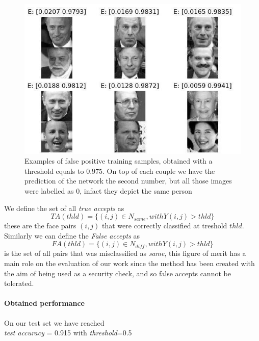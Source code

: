 \begin{figure}[t]
\includegraphics[width=1\linewidth]{images/falsepositive.jpg}
   \caption{Examples of false positive training samples, obtained with a threshold equals to $0.975$. On top of each couple we have the prediction of the network \ie the second number, but all those images were labelled as 0, infact they depict the same person}
\label{fig:long}
\label{fig:onecol}
\end{figure} 
 
We define the set of all \textit{true accepts} as
\begin{equation}
TA(thld)=\{(i,j) \in N_{same}, with Y(i,j) > thld\}
\end{equation}
these are the face pairs $(i,j)$ that were correctly classified at treshold $thld$.
Similarly we can define the \textit{False accepts} as 
\begin{equation}
FA(thld)=\{(i,j) \in N_{diff}, with Y(i,j) > thld\} 
\end{equation}
is the set of all pairs that was misclassified as \textit{same}, this figure of merit has a main role on the evaluation of our work since the method has been created with the aim of being used as a security check, and so false accepts cannot be tolerated.
\paragraph{Obtained performance}
On our test set we have reached \\

\textit{test accuracy }= 0.915 with \textit{threshold}=0.5
\\

